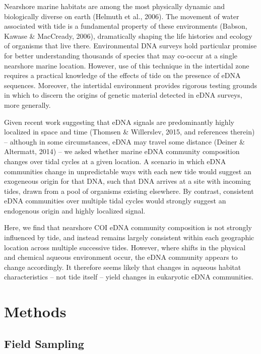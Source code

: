 \documentclass[fleqn,10pt,lineno]{wlpeerj} %
\begin{document}
Nearshore marine habitats are among the most physically dynamic and
biologically diverse on earth (Helmuth et al., 2006). The movement of
water associated with tide is a fundamental property of these
environments (Babson, Kawase \& MacCready, 2006), dramatically shaping
the life histories and ecology of organisms that live there.
Environmental DNA surveys hold particular promise for better
understanding thousands of species that may co-occur at a single
nearshore marine location. However, use of this technique in the
intertidal zone requires a practical knowledge of the effects of tide on
the presence of eDNA sequences. Moreover, the intertidal environment
provides rigorous testing grounds in which to discern the origins of
genetic material detected in eDNA surveys, more generally.

Given recent work suggesting that eDNA signals are predominantly highly
localized in space and time (Thomsen \& Willerslev, 2015, and references
therein) -- although in some circumstances, eDNA may travel some
distance (Deiner \& Altermatt, 2014) -- we asked whether marine eDNA
community composition changes over tidal cycles at a given location. A
scenario in which eDNA communities change in unpredictable ways with
each new tide would suggest an exogeneous origin for that DNA, such that
DNA arrives at a site with incoming tides, drawn from a pool of
organisms existing elsewhere. By contrast, consistent eDNA communities
over multiple tidal cycles would strongly suggest an endogenous origin
and highly localized signal.

Here, we find that nearshore COI eDNA community composition is not
strongly influenced by tide, and instead remains largely consistent
within each geographic location across multiple successive tides.
However, where shifts in the physical and chemical aqueous environment
occur, the eDNA community appears to change accordingly. It therefore
seems likely that changes in aqueous habitat characteristics -- not tide
itself -- yield changes in eukaryotic eDNA communities.

\section{Methods}\label{methods}

\subsection{Field Sampling}\label{field-sampling}
\end{document}
